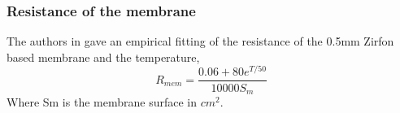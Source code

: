



\subsubsection{Resistance of the membrane}
The authors in  gave an empirical fitting of the resistance of the 0.5mm Zirfon based membrane and the temperature,
\begin{equation}
R_{mem} = \frac{0.06+80e^{T/50}}{10000S_m}
\end{equation}
Where Sm is the membrane surface in $cm^2$.

